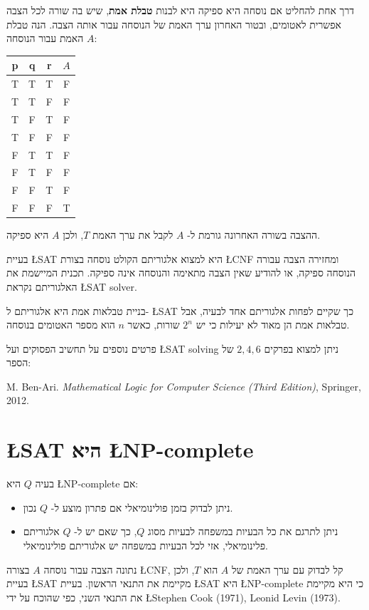 \documentclass[12pt,a4paper]{article}
\begin{document}
דרך אחת להחליט אם נוסחה היא ספיקה היא לבנות
\textbf{טבלת אמת},
שיש בה שורה לכל הצבה אפשרית לאטומים, ובטור האחרון ערך האמת של הנוסחה עבור אותה הצבה. הנה טבלת האמת עבור הנוסחה
$A$:
\begin{center}
\begin{tabular}{|c|c|c||c|}
\hline
p & q & r & $A$\\\hline
T & T & T & F\\\hline
T & T & F & F\\\hline
T & F & T & F\\\hline
T & F & F & F\\\hline
F & T & T & F\\\hline
F & T & F & F\\\hline
F & F & T & F\\\hline
F & F & F & T\\\hline
\end{tabular}
\end{center}
ההצבה בשורה האחרונה גורמת ל-%
$A$
לקבל את ערך האמת
$T$,
ולכן
$A$
היא ספיקה.

בעיית 
\L{SAT}
היא למצוא אלגוריתם הקולט נוסחה בצורת
\L{CNF}
ומחזירה הצבה עבורה הנוסחה ספיקה, או להודיע שאין הצבה מתאימה והנוסחה אינה ספיקה. תכנית המיישמת את האלגוריתם נקראת
\L{SAT solver}.

בניית טבלאות אמת היא אלגוריתם ל-%
\L{SAT}
כך שקיים לפחות אלגוריתם אחד לבעיה, אבל טבלאות אמת הן מאוד לא יעילות כי יש 
$2^n$
שורות, כאשר
$n$
הוא מספר האטומים בנוסחה.

פרטים נוספים על תחשיב הפסוקים ועל
\L{SAT solving}
ניתן למצוא בפרקים
$2,4,6$
של הספר:

M. Ben-Ari. \textit{Mathematical Logic for Computer Science (Third Edition)}, Springer, 2012.



\section{\L{SAT} היא \L{NP-complete}}

בעיה 
$Q$
היא
\L{NP-complete}
אם:
\begin{itemize}
\item
ניתן לבדוק בזמן פולינומיאלי אם פתרון מוצע ל-%
$Q$
נכון.
\item
ניתן לתרגם את כל הבעיות במשפחה לבעיות מסוג 
$Q$,
כך שאם יש ל-%
$Q$
אלגוריתם פלינומיאלי, אזי לכל הבעיות במשפחה יש אלגוריתם פולינומיאלי.
\end{itemize}
נתונה הצבה עבור נוסחה
$A$
בצורה
\L{CNF},
קל לבדוק עם ערך האמת של
$A$
הוא
$T$,
ולכן בעיית
\L{SAT}
מקיימת את התנאי הראשון. בעיית 
\L{SAT}
היא 
\L{NP-complete}
כי היא מקיימת את התנאי השני, כפי שהוכח על ידי
\L{Stephen Cook (1971), Leonid Levin (1973)}.
\end{document}
